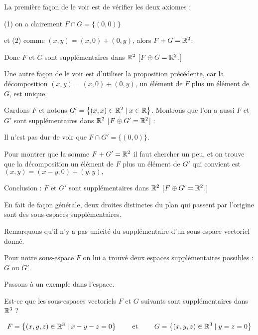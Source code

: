 La première façon de le voir est de vérifier les deux axiomes :

(1) on a clairement $F\cap G = \{ (0,0) \}$

\change

et (2) comme $(x,y)=(x,0)+(0,y)$, alors $F+G = \mathbb{R}^2$.

\change

Donc $F$ et $G$ sont supplémentaires dans $\mathbb{R}^2$ [$F \oplus G = \mathbb{R}^2$.]

\change


Une autre façon de le voir est d'utiliser la proposition précédente,
car la décomposition $(x,y)=(x,0)+(0,y)$, un élément de $F$ plus un élément de $G$, est unique.
 


\change

Gardons $F$ et notons $G' = \big\{ (x,x) \in \mathbb{R}^2 \mid x \in \mathbb{R} \big\}$.
Montrons que l'on a aussi $F$ et $G' $ sont supplémentaires dans $\mathbb{R}^2$ [$F\oplus G'=\mathbb{R}^2$] :

\change

Il n'est pas dur de voir que $F \cap G' =\{(0,0)\}$. 

\change

Pour montrer que la somme $F+G' = \mathbb{R}^2$ il faut chercher un peu, et on trouve que 
la décomposition un élément de $F$ plus un élément de $G'$ qui convient est 
$(x,y) = (x-y,0) + (y,y),$
    
    
    Conclusion : $F$ et $G' $ sont supplémentaires dans $\mathbb{R}^2$ [$F\oplus G'=\mathbb{R}^2$.]
    
    
\change


En fait de façon générale, deux droites distinctes du plan 
qui passent par l'origine sont des sous-espaces supplémentaires.


Remarquons qu'il n'y a pas unicité du supplémentaire d'un sous-espace vectoriel donné.
  
Pour notre sous-espace $F$ on lui a trouvé deux espaces supplémentaires possibles : $G$ ou $G'$.
  

\diapo

Passons à un exemple dans l'espace.

Est-ce que les sous-espaces vectoriels $F$ et $G$ suivants sont supplémentaires dans $\mathbb{R}^3$ ?


$$F=\big\{ (x,y,z) \in \mathbb{R}^3\mid x-y-z=0\big\} \qquad \text { et } \qquad
G=\big\{(x,y,z) \in \mathbb{R}^3 \mid y=z=0\big\}$$



